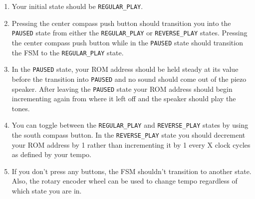 \documentclass[11pt]{article}
\begin{document}
\begin{center}
\end{center}

\begin{enumerate}
	\item Your initial state should be \verb|REGULAR_PLAY|. 
	
	\item Pressing the center compass push button should transition you into the \verb|PAUSED| state from either the \verb|REGULAR_PLAY| or \verb|REVERSE_PLAY| states. Pressing the center compass push button while in the \verb|PAUSED| state should transition the FSM to the \verb|REGULAR_PLAY| state.
	
	\item In the \verb|PAUSED| state, your ROM address should be held steady at its value before the transition into \verb|PAUSED| and no sound should come out of the piezo speaker. After leaving the \verb|PAUSED| state your ROM address should begin incrementing again from where it left off and the speaker should play the tones.
	
	\item You can toggle between the \verb|REGULAR_PLAY| and \verb|REVERSE_PLAY| states by using the south compass button. In the \verb|REVERSE_PLAY| state you should decrement your ROM address by 1 rather than incrementing it by 1 every X clock cycles as defined by your tempo.
		
	\item If you don't press any buttons, the FSM shouldn't transition to another state. Also, the rotary encoder wheel can be used to change tempo regardless of which state you are in.
\end{enumerate}
\end{document}
